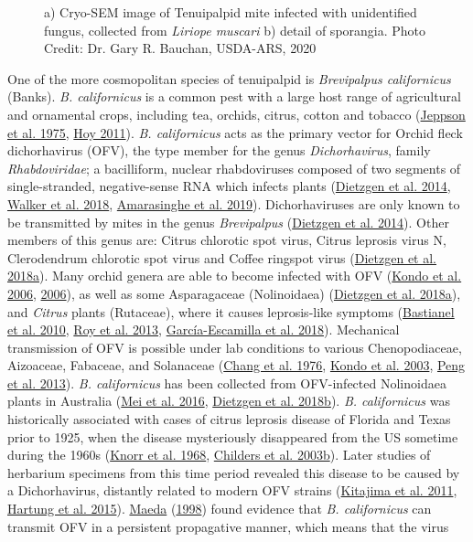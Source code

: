 \documentclass[12pt,final,CPage]{ufthesis}
\begin{document}
{\begin{figure}
  \caption{a) Cryo-SEM image of Tenuipalpid mite infected with unidentified fungus, collected from \textit{Liriope muscari} b) detail of sporangia. Photo Credit: Dr. Gary R. Bauchan, USDA-ARS, 2020}\label{fig:brevi-fungus}
  \end{figure}
  One of the more cosmopolitan species of tenuipalpid is \emph{Brevipalpus californicus} (Banks). \emph{B. californicus} is a common pest with a large host range of agricultural and ornamental crops, including tea, orchids, citrus, cotton and tobacco (\protect\hyperlink{ref-Jeppson1975}{Jeppson et al. 1975}, \protect\hyperlink{ref-Hoy2011}{Hoy 2011}). \emph{B. californicus} acts as the primary vector for Orchid fleck dichorhavirus (OFV), the type member for the genus \emph{Dichorhavirus}, family \emph{Rhabdoviridae}; a bacilliform, nuclear rhabdoviruses composed of two segments of single-stranded, negative-sense RNA which infects plants (\protect\hyperlink{ref-Dietzgen2014}{Dietzgen et al. 2014}, \protect\hyperlink{ref-Walker2018}{Walker et al. 2018}, \protect\hyperlink{ref-Amarasinghe2019}{Amarasinghe et al. 2019}). Dichorhaviruses are only known to be transmitted by mites in the genus \emph{Brevipalpus} (\protect\hyperlink{ref-Dietzgen2014}{Dietzgen et al. 2014}). Other members of this genus are: Citrus chlorotic spot virus, Citrus leprosis virus N, Clerodendrum chlorotic spot virus and Coffee ringspot virus (\protect\hyperlink{ref-Dietzgen2018}{Dietzgen et al. 2018a}). Many orchid genera are able to become infected with OFV (\protect\hyperlink{ref-Kondo2006}{Kondo et al. 2006}, \protect\hyperlink{ref-Kondo2006}{2006}), as well as some Asparagaceae (Nolinoidaea) (\protect\hyperlink{ref-Dietzgen2018}{Dietzgen et al. 2018a}), and \emph{Citrus} plants (Rutaceae), where it causes leprosis-like symptoms (\protect\hyperlink{ref-Bastianel2010}{Bastianel et al. 2010}, \protect\hyperlink{ref-Roy2013a}{Roy et al. 2013}, \protect\hyperlink{ref-GarciaEscamilla2018}{García-Escamilla et al. 2018}). Mechanical transmission of OFV is possible under lab conditions to various Chenopodiaceae, Aizoaceae, Fabaceae, and Solanaceae (\protect\hyperlink{ref-Chang1976}{Chang et al. 1976}, \protect\hyperlink{ref-Kondo2003}{Kondo et al. 2003}, \protect\hyperlink{ref-Peng2013}{Peng et al. 2013}). \emph{B. californicus} has been collected from OFV-infected Nolinoidaea plants in Australia (\protect\hyperlink{ref-Mei2016}{Mei et al. 2016}, \protect\hyperlink{ref-Dietzgen2018a}{Dietzgen et al. 2018b}). \emph{B. californicus} was historically associated with cases of citrus leprosis disease of Florida and Texas prior to 1925, when the disease mysteriously disappeared from the US sometime during the 1960s (\protect\hyperlink{ref-Knorr1968b}{Knorr et al. 1968}, \protect\hyperlink{ref-Childers2003}{Childers et al. 2003b}). Later studies of herbarium specimens from this time period revealed this disease to be caused by a Dichorhavirus, distantly related to modern OFV strains (\protect\hyperlink{ref-Kitajima2011a}{Kitajima et al. 2011}, \protect\hyperlink{ref-Hartung2015}{Hartung et al. 2015}). \protect\hyperlink{ref-Maeda1998}{Maeda} (\protect\hyperlink{ref-Maeda1998}{1998}) found evidence that \emph{B. californicus} can transmit OFV in a persistent propagative manner, which means that the virus }
\end{document}
